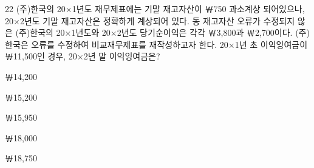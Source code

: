 \begin{question}{22}
(주)한국의 20×1년도 재무제표에는 기말 재고자산이 ￦750 과소계상 되어있으나, 20×2년도 기말 재고자산은 정확하게 계상되어 있다. 동 재고자산 오류가 수정되지 않은 (주)한국의 20×1년도와 20×2년도 당기순이익은 각각 ￦3,800과 ￦2,700이다. (주)한국은 오류를 수정하여 비교재무제표를 재작성하고자 한다. 20×1년 초 이익잉여금이 ￦11,500인 경우, 20×2년 말 이익잉여금은?
\begin{choices}
  \item ￦14,200
  \item ￦15,200
  \item ￦15,950
  \item ￦18,000
  \item ￦18,750
\end{choices}
\end{question}
